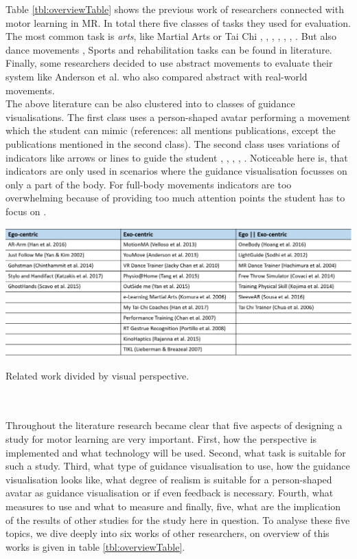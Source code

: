 Table \ref{tbl:overviewTable} shows the previous work of researchers connected with motor learning in MR. In total there five classes of tasks they used for evaluation. The most common task is \textit{arts}, like Martial Arts or Tai Chi \cite{Han2016}, \cite{Yang2002}, \cite{Katzakis2017}, \cite{Han2017}, \cite{Portillo2008}, \cite{Hoang2016}, \cite{Chua2003} \cite{Komura2006}. But also dance movements \cite{Anderson2013a}\cite{Yan2015}\cite{Chan2010}\cite{Chan2007}\cite{Hachimura2004}, Sports \cite{Covaci2014}\cite{Kojima2014} and rehabilitation tasks \cite{Velloso2013}\cite{Chinthammit2014}\cite{Tang2015}\cite{Rajanna2015}\cite{Sousa2016} can be found in literature. Finally, some researchers decided to use abstract movements \cite{Sodhi2012}\cite{Lieberman2007} to evaluate their system like Anderson et al. \cite{Anderson2013a} who also compared abstract with real-world movements.\\
The above literature can be also clustered into to classes of guidance visualisations. The first class uses a person-shaped avatar performing a movement which the student can mimic (references: all mentions publications, except the publications mentioned in the second class). The second class uses variations of indicators like arrows or lines to guide the student \cite{Katzakis2017}, \cite{Tang2015}, \cite{Sodhi2012}, \cite{Covaci2014}, \cite{Sousa2016}. Noticeable here is, that indicators are only used in scenarios where the guidance visualisation focusses on only a part of the body. For full-body movements indicators are too overwhelming because of providing too much attention points the student has to focus on \cite{Sodhi2012}.
\begin{table}
	\centering
	\includegraphics[width=1.0\textwidth]{img/overview_table.png}
	\caption{Related work divided by visual perspective.}
	\label{tbl:overviewTable}
\end{table}\\ $ $\\
Throughout the literature research became clear that five aspects of designing a study for motor learning are very important. First, how the perspective is implemented and what technology will be used. Second, what task is suitable for such a study. Third, what type of guidance visualisation to use, how the guidance visualisation looks like, what degree of realism is suitable for a person-shaped avatar as guidance visualisation or if even feedback is necessary. Fourth, what measures to use and what to measure and finally, five, what are the implication of the results of other studies for the study here in question. To analyse these five topics, we dive deeply into six works of other researchers, on overview of this works is given in table \ref{tbl:overviewTable}.
